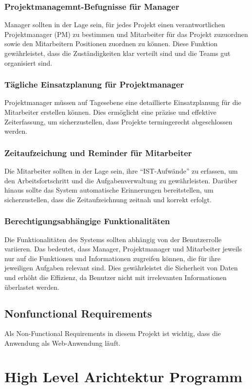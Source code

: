 \documentclass{article}
\begin{document}
\subsubsection{Projektmanagemnt-Befugnisse für Manager}
Manager sollten in der Lage sein, für jedes Projekt einen verantwortlichen
Projektmanager (PM) zu bestimmen und Mitarbeiter für das Projekt zuzuordnen
sowie den Mitarbeitern Positionen zuordnen zu können. Diese Funktion
gewährleistet, dass die Zuständigkeiten klar verteilt sind und die Teams gut
organisiert sind.
\subsubsection{Tägliche Einsatzplanung für Projektmanager}
Projektmanager müssen auf Tagesebene eine detaillierte Einsatzplanung für die
Mitarbeiter erstellen können. Dies ermöglicht eine präzise und effektive
Zeiterfassung, um sicherzustellen, dass Projekte termingerecht abgeschlossen
werden.
\subsubsection{Zeitaufzeichung und Reminder für Mitarbeiter}
Die Mitarbeiter sollten in der Lage sein, ihre “IST-Aufwände” zu erfassen, um
den Arbeitsfortschritt und die Aufgabenverwaltung zu gewährleisten. Darüber
hinaus sollte das System automatische Erinnerungen bereitstellen, um
sicherzustellen, dass die Zeitaufzeichnung zeitnah und korrekt erfolgt.
\subsubsection{Berechtigungsabhängige Funktionalitäten}
Die Funktionalitäten des Systems sollten abhängig von der Benutzerrolle
variieren. Das bedeutet, dass Manager, Projektmanager und Mitarbeiter jeweils
nur auf die Funktionen und Informationen zugreifen können, die für ihre
jeweiligen Aufgaben relevant sind. Dies gewährleistet die Sicherheit von Daten
und erhöht die Effizienz, da Benutzer nicht mit irrelevanten Informationen
überlastet werden.
\subsection{ Nonfunctional Requirements}
Als Non-Functional Requirements in diesem Projekt ist wichtig, dass die
Anwendung als Web-Anwendung läuft.

\newpage

\section{High Level Arichtektur Programm}
\end{document}
